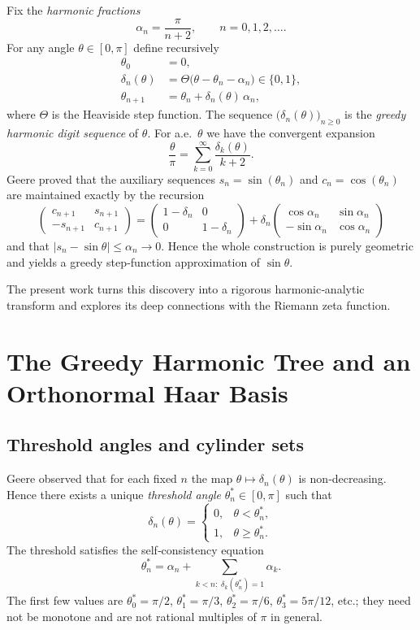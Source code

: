\documentclass[11pt,a4paper]{article}
\theoremstyle{remark}
\begin{document}
Fix the \emph{harmonic fractions}
\[
\alpha_n = \frac{\pi}{n+2}, \qquad n = 0,1,2,\dots .
\]
For any angle \(\theta\in[0,\pi]\) define recursively
\[
\begin{aligned}
\theta_0 &= 0,\\
\delta_n(\theta) &= \Theta\bigl(\theta - \theta_n - \alpha_n\bigr) \in\{0,1\},\\
\theta_{n+1} &= \theta_n + \delta_n(\theta)\,\alpha_n,
\end{aligned}
\tag{1}
\]
where \(\Theta\) is the Heaviside step function. The sequence \(\bigl(\delta_n(\theta)\bigr)_{n\ge0}\) is the \emph{greedy harmonic digit sequence} of \(\theta\). For a.e.\ \(\theta\) we have the convergent expansion
\[
\frac{\theta}{\pi} = \sum_{k=0}^{\infty} \frac{\delta_k(\theta)}{k+2}.
\tag{2}
\]
Geere proved that the auxiliary sequences \(s_n = \sin(\theta_n)\) and \(c_n = \cos(\theta_n)\) are maintained exactly by the recursion
\[
\begin{pmatrix}
c_{n+1} & s_{n+1} \\
-s_{n+1} & c_{n+1}
\end{pmatrix}
=
\begin{pmatrix}
1-\delta_n & 0 \\
0 & 1-\delta_n
\end{pmatrix}
+
\delta_n
\begin{pmatrix}
\cos\alpha_n & \sin\alpha_n \\
-\sin\alpha_n & \cos\alpha_n
\end{pmatrix}
\]
and that \(|s_n - \sin\theta| \le \alpha_n \to 0\). Hence the whole construction is purely geometric and yields a greedy step‑function approximation of \(\sin\theta\).

The present work turns this discovery into a rigorous harmonic‑analytic transform and explores its deep connections with the Riemann zeta function.

\section{The Greedy Harmonic Tree and an Orthonormal Haar Basis}

\subsection{Threshold angles and cylinder sets}

Geere observed that for each fixed \(n\) the map \(\theta\mapsto\delta_n(\theta)\) is non‑decreasing. Hence there exists a unique \emph{threshold angle} \(\theta_n^*\in[0,\pi]\) such that
\[
\delta_n(\theta) =
\begin{cases}
0, & \theta<\theta_n^*,\\
1, & \theta\ge\theta_n^*.
\end{cases}
\tag{3}
\]
The threshold satisfies the self‑consistency equation
\[
\theta_n^* = \alpha_n + \sum_{k<n: \;\delta_k(\theta_n^*)=1}\alpha_k .
\tag{4}
\]
The first few values are \(\theta_0^*=\pi/2\), \(\theta_1^*=\pi/3\), \(\theta_2^*=\pi/6\), \(\theta_3^*=5\pi/12\), etc.; they need not be monotone and are not rational multiples of \(\pi\) in general.
\end{document}
